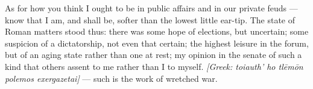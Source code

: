  As for how you think I ought to be in public affairs and in our private feuds — know that I am, and shall be, softer than the lowest little ear-tip. The state of Roman matters stood thus: there was some hope of elections, but uncertain; some suspicion of a dictatorship, not even that certain; the highest leisure in the forum, but of an aging state rather than one at rest; my opinion in the senate of such a kind that others assent to me rather than I to myself. \textit{[Greek: toiauth' ho tlēmōn polemos exergazetai]} — such is the work of wretched war.
